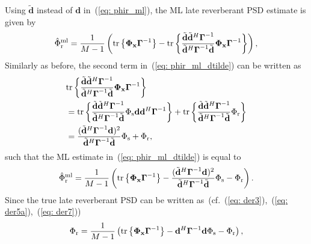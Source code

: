 \documentclass[10pt]{IEEEtran}
\begin{document}
Using $\tilde{\mathbf{d}}$ instead of $\mathbf{d}$ in~(\ref{eq: phir_ml}), the ML late reverberant PSD estimate is given by
\begin{equation}
\label{eq: phir_ml_dtilde}
\hat{\Phi}_{\rm r}^{\rm ml} = \frac{1}{M-1} \left( {\rm tr} \left\{  \boldsymbol{\Phi}_{\mathbf{x}}\boldsymbol{\Gamma}^{-1} \right\} - {\rm tr} \left\{ \frac{\tilde{\mathbf{d}}\tilde{\mathbf{d}}^{H}\boldsymbol{\Gamma}^{-1}}{\tilde{\mathbf{d}}^H\boldsymbol{\Gamma}^{-1}\tilde{\mathbf{d}}} \boldsymbol{\Phi}_{\mathbf{x}}\boldsymbol{\Gamma}^{-1}\right\} \right),
\end{equation}
Similarly as before, the second term in~(\ref{eq: phir_ml_dtilde}) can be written as
\begin{align}
& {\rm tr} \left\{\frac{\tilde{\mathbf{d}} \tilde{\mathbf{d}}^H \boldsymbol{\Gamma}^{-1} } {\tilde{\mathbf{d}}^H\boldsymbol{\Gamma}^{-1}\tilde{\mathbf{d}}} \mathbf{\Phi}_{\mathbf{x}}\boldsymbol{\Gamma}^{-1}\right\}  \\
&  = {\rm tr} \left\{\frac{\tilde{\mathbf{d}} \tilde{\mathbf{d}}^H \boldsymbol{\Gamma}^{-1} } {\tilde{\mathbf{d}}^H\boldsymbol{\Gamma}^{-1}\tilde{\mathbf{d}}} \Phi_{\rm s}\mathbf{d}\mathbf{d}^H  \boldsymbol{\Gamma}^{-1}\right\} + {\rm tr} \left\{\frac{\tilde{\mathbf{d}} \tilde{\mathbf{d}}^H \boldsymbol{\Gamma}^{-1} } {\tilde{\mathbf{d}}^H\boldsymbol{\Gamma}^{-1}\tilde{\mathbf{d}}} \Phi_{\rm r} \right\} \\
& = \frac{( \tilde{\mathbf{d}}^H \boldsymbol{\Gamma}^{-1}\mathbf{d})^2 } {\tilde{\mathbf{d}}^H\boldsymbol{\Gamma}^{-1}\tilde{\mathbf{d}}} \Phi_{\rm s} + \Phi_{\rm r},
\end{align}
such that the ML estimate in~(\ref{eq: phir_ml_dtilde}) is equal to
\begin{equation}
\label{eq: phir_ml_dtilde_2}
\hat{\Phi}_{\rm r}^{\rm ml} = \frac{1}{M-1} \left(  {\rm tr} \left\{ \boldsymbol{\Phi}_{\mathbf{x}}\boldsymbol{\Gamma}^{-1} \right\}  - \frac{( \tilde{\mathbf{d}}^H \boldsymbol{\Gamma}^{-1}\mathbf{d})^2 } {\tilde{\mathbf{d}}^H\boldsymbol{\Gamma}^{-1}\tilde{\mathbf{d}}} \Phi_{\rm s} - \Phi_{\rm r} \right).
\end{equation}
Since the true late reverberant PSD can be written as~(cf.~(\ref{eq: der3}),~(\ref{eq: der5a}),~(\ref{eq: der7}))
\begin{equation}
\label{eq: true_phir_2}
\Phi_{\rm r} = \frac{1}{M-1} \left( {\rm tr} \left\{  \boldsymbol{\Phi}_{\mathbf{x}}\boldsymbol{\Gamma}^{-1} \right\} - \mathbf{d}^H\boldsymbol{\Gamma}^{-1}\mathbf{d}\Phi_{\rm s} - \Phi_{\rm r} \right),
\end{equation}
\end{document}
